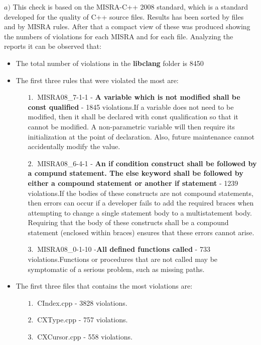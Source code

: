 \hspace{-0.6cm} $a)$  
This check is based on the MISRA-C++ 2008 standard, which is a standard developed for the quality of C++ source files.\newline
Results has been sorted by files and by MISRA rules. After that a compact view of these was produced showing the numbers of violations for each MISRA and for each file.\newline
Analyzing the reports it can be observed that:
\begin{itemize}
	\item The total number of violations in the \textbf{libclang} folder is 8450
	\item The first three rules that were violated the most are:
	\begin{itemize}
		\item[$1.\:$] MISRA08\_7-1-1 - \textbf{A variable which is not modified shall be const qualified} - 1845 violations.\newline If a variable does not need to be modified, then it shall be declared with const qualification so that it cannot be modified. A non-parametric variable will then require its initialization at the point of declaration. Also, future maintenance cannot accidentally modify the value.
		\item[$2.\:$] MISRA08\_6-4-1 - \textbf{An if condition construct shall be followed by a compund statement. The else keyword shall be followed by either a compound statement or another if statement} - 1239 violations.\newline If the bodies of these constructs are not compound statements, then errors can occur if a developer fails to add the required braces when attempting to change a single statement body to a multistatement body.
		Requiring that the body of these constructs shall be a compound statement (enclosed within braces) ensures that these errors cannot arise.
		\item[$3.\:$] MISRA08\_0-1-10 -\textbf{All defined functions called} - 733 violations.\newline Functions or procedures that are not called may be symptomatic of a serious problem, such as missing paths.
	\end{itemize}
	\item The first three files that contains the most violations are:
		\begin{itemize}
		\item[$1.\:$] CIndex.cpp - 3828 violations.
		\item[$2.\:$] CXType.cpp - 757 violations.
		\item[$3.\:$] CXCursor.cpp - 558 violations.
	\end{itemize}
\end{itemize}

